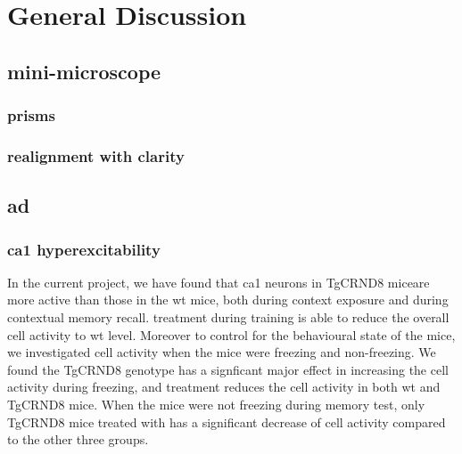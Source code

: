 \chapter{General Discussion}
\begin{comment}
\section{Summary of result}
\subsection{Summary of result}
\subsubsection{Hyperactivity}
\subsubsection{Cellular freezing encoding}
\subsubsection{Network freezing encoding}
\end{comment}
\section{mini-microscope}
\subsection{prisms}
\subsection{realignment with clarity}
\section{\gls{ad}}

\subsection{\gls{ca1} hyperexcitability}
In the current project, we have found that \gls{ca1} neurons in TgCRND8 miceare more active than those in the \gls{wt} mice, both during context exposure and during contextual memory recall. \tglu{} treatment during training is able to reduce the overall cell activity to \gls{wt} level. Moreover to control for the behavioural state of the mice, we investigated cell activity when the mice were freezing and non-freezing. We found the TgCRND8 genotype has a signficant major effect in increasing the cell activity during freezing, and \tglu treatment reduces the cell activity in both \gls{wt} and TgCRND8 mice. When the mice were not freezing during memory test, only TgCRND8 mice treated with \tglu has a significant decrease of cell activity compared to the other three groups. 

